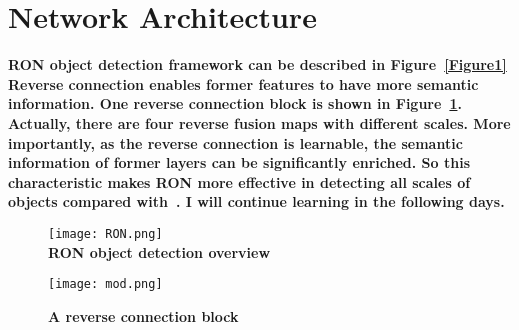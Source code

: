 \documentclass[35pt]{article}
\begin{document}
\section{Network Architecture}
\textbf{RON object detection framework can be described in Figure~\ref{Figure1} Reverse connection enables former features to have more semantic information.  One reverse connection block is shown in Figure~\ref{Figure2}. Actually, there are four reverse fusion maps with different scales.  More importantly, as the reverse connection is learnable, the semantic information of former layers can be
signiﬁcantly enriched. So this characteristic makes RON more effective in detecting all scales of objects compared with~\cite{name4}. I will continue learning in the following days.
}\\
 \begin{figure}[htbp]
 \centering
 \texttt{[image: RON.png]}\\
 \caption{\textbf{RON object detection overview}}\label{Figure1}
  \centering
 \texttt{[image: mod.png]}\\
 \caption{\textbf{A reverse connection block}}\label{Figure2}
\end{figure}
  

\end{document}
